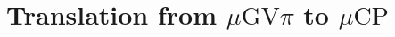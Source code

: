 \documentclass[orivec,envcountsame]{llncs}
\makeatletter
\newcommand{\gvout}[2]{{!#1.#2}}
\newcommand{\outterm}{\mathrm{end}_!}
\newcommand{\gvservice}[1]{\sharp #1}
\newcommand{\gvtyp}[3]{#1 \vdash #2 : #3}
\newcommand{\mkwd}[1]{\mathsf{#1}}
\newcommand{\cut}[4]{\mkwd{new}\:#1 \: (#3 \mid #4)}
\newcommand{\corec}[5]{\mkwd{corec}\:#1 \langle #2 \rangle (#4,#5)}
\newcommand{\gvsend}[2]{\mkwd{send}\:#1\:#2}
\newcommand{\gvreceive}[1]{\mkwd{receive}\:#1}
\newcommand{\gvlet}[3]{\mkwd{let}\;#1 = #2\;\mkwd{in}\;#3}
\newcommand{\gvfork}[2]{\mkwd{fork}\:#1.#2}
\newcommand{\lrkwd}{\mkwd{fix}}
\newcommand{\gvfix}[3]{\lrkwd\:#1\:#2 = #3}
\newcommand{\gvletrec}[4]{\gvlet{#1}{\gvfix{#1}{#2}{#3}}{#4}}
\newcommand{\gvrequest}[1]{\mkwd{request}\:#1}
\newcommand{\key}{\mkwd}
\newcommand{\tocp}[1]{\llbracket #1 \rrbracket}
\newcommand{\mucp}{$\mu\mathrm{CP}$\xspace}
\newcommand{\gvpi}{$\mu\mathrm{GV}\pi$\xspace}
\newcommand{\ba}{\begin{array}}
\newcommand{\ea}{\end{array}}
\newcommand{\bl}{\ba[t]{@{}l@{}}}
\newcommand{\el}{\ea}
\newcommand{\todo}[1]{{\noindent\small\color{red} \framebox{\parbox{\dimexpr\linewidth-2\fboxsep-2\fboxrule}{\textbf{TODO:} #1}}}}
\makeatother
\begin{document}






\section{Translation from \gvpi to \mucp}\label{sec:gvpitocp}

\end{document}
